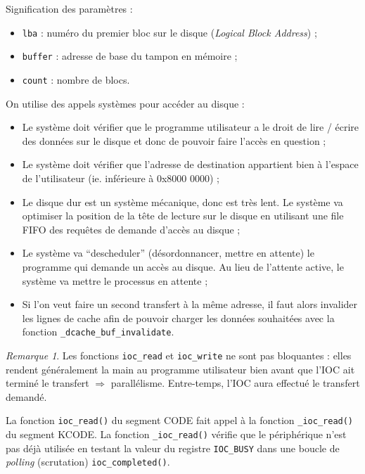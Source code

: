 \documentclass[11pt,english,french]{scrreprt}
\theoremstyle{remark}
\newtheorem*{rem*}{Remarque}
\theoremstyle{definition}
\begin{document}
Signification des paramètres :\begin{itemize}
	\item \lstinline!lba! : numéro du premier bloc sur le disque (\emph{Logical Block Address}) ;
	\item \lstinline!buffer! : adresse de base du tampon en mémoire ;
	\item \lstinline!count! : nombre de blocs.
\end{itemize}

\vspace{7pt}

On utilise des appels systèmes pour accéder au disque : \begin{itemize}
	\item Le système doit vérifier que le programme utilisateur a le droit de lire / écrire des données sur le disque et donc de pouvoir faire l'accès en question ;
	\item Le système doit vérifier que l'adresse de destination appartient bien à l'espace de l'utilisateur (ie. inférieure à 0x8000 0000) ;
	\item Le disque dur est un système mécanique, donc est très lent. Le système va optimiser la position de la tête de lecture sur le disque en utilisant une file FIFO des requêtes de demande d'accès au disque ;
	\item Le système va ``descheduler'' (désordonnancer, mettre en attente) le programme qui demande un accès au disque. Au lieu de l'attente active, le système va mettre le processus en attente ;
	\item Si l'on veut faire un second transfert à la même adresse, il faut alors invalider les lignes de cache afin de pouvoir charger les données souhaitées avec la fonction \lstinline!_dcache_buf_invalidate!.
\end{itemize}

\begin{rem*}
	Les fonctions \lstinline!ioc_read! et \lstinline!ioc_write! ne sont pas bloquantes : elles rendent généralement la main au programme utilisateur bien avant que l'IOC ait terminé le transfert $\Rightarrow$ parallélisme. Entre-temps, l'IOC aura effectué le transfert demandé.
\end{rem*}

La fonction \lstinline!ioc_read()! du segment CODE fait appel à la fonction \lstinline!_ioc_read()! du segment KCODE. La fonction \lstinline!_ioc_read()! vérifie que le périphérique n'est pas déjà utilisée en testant la valeur du registre \lstinline!IOC_BUSY! dans une boucle de \emph{polling} (scrutation) \lstinline!ioc_completed()!. 
\end{document}
